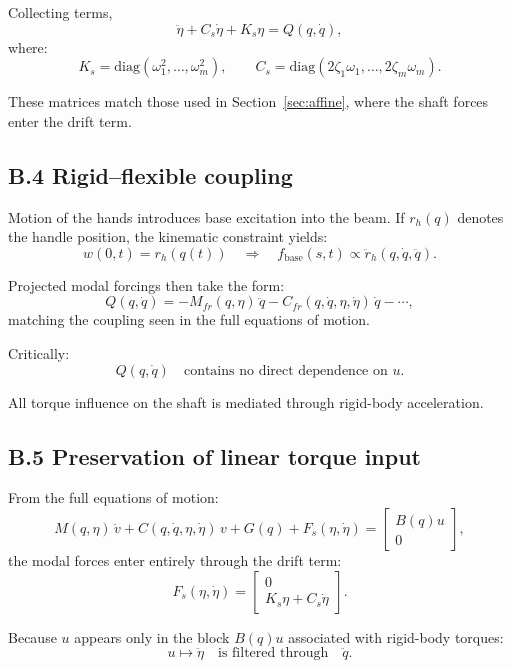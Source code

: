 \documentclass[12pt]{article}
\begin{document}
Collecting terms,
\[
  \ddot{\eta} + C_s \dot{\eta} + K_s \eta = Q(q,\dot{q}),
\]
where:
\[
  K_s = \mathrm{diag}(\omega_1^2,\dots,\omega_m^2),\qquad
  C_s = \mathrm{diag}(2\zeta_1\omega_1,\dots,2\zeta_m\omega_m).
\]

These matrices match those used in Section~\ref{sec:affine}, where the shaft forces enter the drift term.

\subsection{B.4 \quad Rigid--flexible coupling}

Motion of the hands introduces base excitation into the beam. If \(r_h(q)\) denotes the handle position, the kinematic constraint yields:
\[
  w(0,t) = r_h(q(t)) \quad \Rightarrow \quad f_{\mathrm{base}}(s,t) \propto \ddot{r}_h(q,\dot{q},\ddot{q}).
\]

Projected modal forcings then take the form:
\[
  Q(q,\dot{q})
  = 
  - M_{fr}(q,\eta)\,\ddot{q}
  - C_{fr}(q,\dot{q},\eta,\dot{\eta})\,\dot{q}
  - \cdots,
\]
matching the coupling seen in the full equations of motion.

Critically:
\[
  Q(q,\dot{q}) \quad \text{contains no direct dependence on } u.
\]

All torque influence on the shaft is mediated through rigid-body acceleration.

\subsection{B.5 \quad Preservation of linear torque input}

From the full equations of motion:
\[
  M(q,\eta)\,\ddot{v} + C(q,\dot{q},\eta,\dot{\eta})\,v + G(q) + F_s(\eta,\dot{\eta})
  =
  \begin{bmatrix}
    B(q)u \\ 0
  \end{bmatrix},
\]
the modal forces enter entirely through the drift term:
\[
  F_s(\eta,\dot{\eta}) = 
  \begin{bmatrix}
    0 \\
    K_s \eta + C_s \dot{\eta}
  \end{bmatrix}.
\]

Because \(u\) appears only in the block \(B(q)u\) associated with rigid-body torques:
\[
  u \mapsto \ddot{\eta} \quad \text{is filtered through} \quad \ddot{q}.
\]
\end{document}
